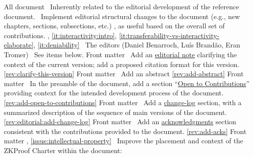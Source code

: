 All document
\newcol \ccontext\ Inherently related to the editorial development of the reference document. 
				\propContrib\ Implement editorial structural changes to the document (e.g., new chapters, 
				sections, subsections, etc.) , as useful based on the overall set of contributions.
\newcol {}, \ref{it:interactivity:intro}, \ref{it:transferability-vs-interactivity-elaborate}, \ref{it:deniability}
\newcol \contributors\ The editors (Daniel Benarroch, Luís Brandão, Eran Tromer)
				\Chan\ See items below.
\newcol 
\rowendL
Front matter
\newcol 
\newcol {}
\newcol \Chan\ Add an \hyperref[sec:prelim:msg-editors]{editorial note} clarifying the context of the current version; add a proposed citation format for this version.
\newcol \ref{rev:clarify-this-version}
\rowendL
Front matter
\newcol 
\newcol {}
\newcol \Chan\ Add an abstract
\newcol \ref{rev:add-abstract}
\rowendL
Front matter
\newcol 
\newcol {}
\newcol \Chan\ In the preamble of the document, add a section ``\hyperref[sec:prelim:open-to-contributions]{Open to Contributions}'' providing context for the intended development process of the document.
\newcol \ref{rev:add-open-to-contributions}
\rowendL
Front matter
\newcol 
\newcol {}
\newcol \Chan\ Add a \hyperref[sec:prelim:change-log]{change-log} section, with a summarized description of the sequence of main versions of the document.
\newcol \ref{rev:editorial:add-change-log}
\rowendL
Front matter
\newcol 
\newcol {}
\newcol \Chan\ Add an \hyperref[sec:prelim:acknowledgments]{acknowledgments} section consistent with the contributions provided to the document.
\newcol \ref{rev:add-acks}
\rowendL
Front matter
\newcol 
\newcol {}, \ref{issue:intellectual-property}
\newcol \Chan\ Improve the placement and context of the ZKProof Charter within the document:
